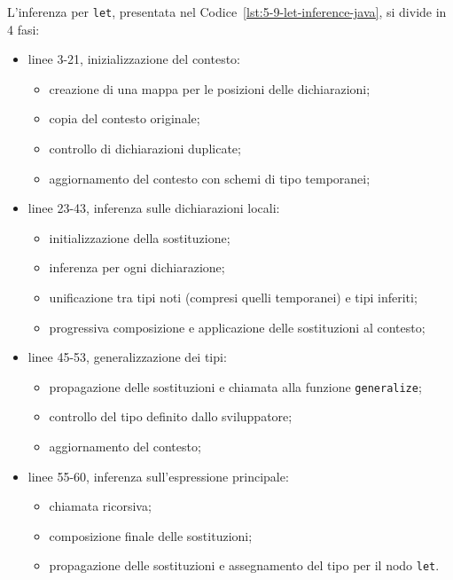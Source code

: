 \noindent L'inferenza per \texttt{let}, presentata nel Codice~\ref{lst:5-9-let-inference-java}, si divide in 4 fasi:
\begin{itemize}
    \item linee 3-21, inizializzazione del contesto:
          \begin{itemize}
              \item creazione di una mappa per le posizioni delle dichiarazioni;
              \item copia del contesto originale;
              \item controllo di dichiarazioni duplicate;
              \item aggiornamento del contesto con schemi di tipo temporanei;
          \end{itemize}
    \item linee 23-43, inferenza sulle dichiarazioni locali:
          \begin{itemize}
              \item initializzazione della sostituzione;
              \item inferenza per ogni dichiarazione;
              \item unificazione tra tipi noti (compresi quelli temporanei) e tipi inferiti;
              \item progressiva composizione e applicazione delle sostituzioni al contesto;
          \end{itemize}
    \item linee 45-53, generalizzazione dei tipi:
          \begin{itemize}
              \item propagazione delle sostituzioni e chiamata alla funzione \texttt{generalize};
              \item controllo del tipo definito dallo sviluppatore;
              \item aggiornamento del contesto;
          \end{itemize}
    \item linee 55-60, inferenza sull'espressione principale:
          \begin{itemize}
              \item chiamata ricorsiva;
              \item composizione finale delle sostituzioni;
              \item propagazione delle sostituzioni e assegnamento del tipo per il nodo \texttt{let}.
          \end{itemize}
\end{itemize}

